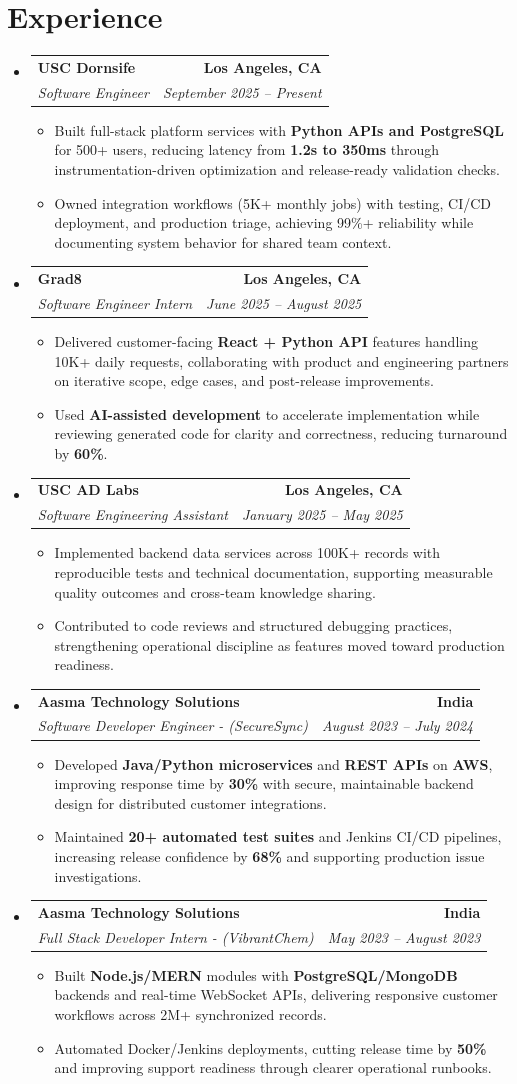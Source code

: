 \documentclass[letterpaper,10pt]{article}
\makeatletter
\newcommand{\resumeItem}[1]{\item\small{{#1 \vspace{-2pt}}}}
\newcommand{\resumeSubheading}[4]{\vspace{-1pt}\item\begin{tabular*}{1.0\textwidth}[t]{l@{\extracolsep{\fill}}r}\textbf{#1} & \textbf{\small #2} \\\textit{\small#3} & \textit{\small #4} \\\end{tabular*}\vspace{-2pt}}
\newcommand{\resumeSubHeadingListStart}{\begin{itemize}[leftmargin=0.0in, label={}]}
\newcommand{\resumeSubHeadingListEnd}{\end{itemize}}
\newcommand{\resumeItemListStart}{\begin{itemize}[leftmargin=0.15in,label=\textbullet,itemsep=2pt,topsep=0pt,parsep=0pt,partopsep=0pt]}
\newcommand{\resumeItemListEnd}{\end{itemize}\vspace{-4pt}}
\makeatother
\begin{document}
\section{Experience}
\resumeSubHeadingListStart
\resumeSubheading{USC Dornsife}{Los Angeles, CA}{Software Engineer}{September 2025 -- Present}
\resumeItemListStart
\resumeItem{Built full-stack platform services with \textbf{Python APIs and PostgreSQL} for 500+ users, reducing latency from \textbf{1.2s to 350ms} through instrumentation-driven optimization and release-ready validation checks.}
\resumeItem{Owned integration workflows (5K+ monthly jobs) with testing, CI/CD deployment, and production triage, achieving 99\%+ reliability while documenting system behavior for shared team context.}
\resumeItemListEnd
\resumeSubheading{Grad8}{Los Angeles, CA}{Software Engineer Intern}{June 2025 -- August 2025}
\resumeItemListStart
\resumeItem{Delivered customer-facing \textbf{React + Python API} features handling 10K+ daily requests, collaborating with product and engineering partners on iterative scope, edge cases, and post-release improvements.}
\resumeItem{Used \textbf{AI-assisted development} to accelerate implementation while reviewing generated code for clarity and correctness, reducing turnaround by \textbf{60\%}.}
\resumeItemListEnd
\resumeSubheading{USC AD Labs}{Los Angeles, CA}{Software Engineering Assistant}{January 2025 -- May 2025}
\resumeItemListStart
\resumeItem{Implemented backend data services across 100K+ records with reproducible tests and technical documentation, supporting measurable quality outcomes and cross-team knowledge sharing.}
\resumeItem{Contributed to code reviews and structured debugging practices, strengthening operational discipline as features moved toward production readiness.}
\resumeItemListEnd
\resumeSubheading{Aasma Technology Solutions}{India}{Software Developer Engineer - (SecureSync)}{August 2023 -- July 2024}
\resumeItemListStart
\resumeItem{Developed \textbf{Java/Python microservices} and \textbf{REST APIs} on \textbf{AWS}, improving response time by \textbf{30\%} with secure, maintainable backend design for distributed customer integrations.}
\resumeItem{Maintained \textbf{20+ automated test suites} and Jenkins CI/CD pipelines, increasing release confidence by \textbf{68\%} and supporting production issue investigations.}
\resumeItemListEnd
\resumeSubheading{Aasma Technology Solutions}{India}{Full Stack Developer Intern - (VibrantChem)}{May 2023 -- August 2023}
\resumeItemListStart
\resumeItem{Built \textbf{Node.js/MERN} modules with \textbf{PostgreSQL/MongoDB} backends and real-time WebSocket APIs, delivering responsive customer workflows across 2M+ synchronized records.}
\resumeItem{Automated Docker/Jenkins deployments, cutting release time by \textbf{50\%} and improving support readiness through clearer operational runbooks.}
\resumeItemListEnd
\resumeSubHeadingListEnd
\vspace{-14pt}
\end{document}
